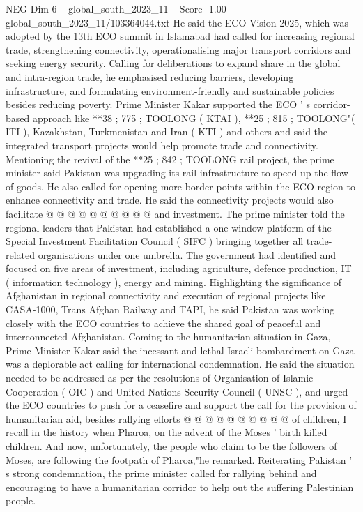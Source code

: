 \begin{textsample}{NEG Dim 6 – global\_south\_2023\_11 – Score -1.00 – global\_south\_2023\_11/103364044.txt}
He said the ECO Vision 2025, which was adopted by the 13th ECO summit in Islamabad had called for increasing regional trade, strengthening connectivity, operationalising major transport corridors and seeking energy security.
Calling for deliberations to expand share in the global and intra-region trade, he emphasised reducing barriers, developing infrastructure, and formulating environment-friendly and sustainable policies besides reducing poverty.
Prime Minister Kakar supported the ECO ' s corridor-based approach like **38 ; 775 ; TOOLONG ( KTAI ), **25 ; 815 ; TOOLONG"( ITI ), Kazakhstan, Turkmenistan and Iran ( KTI ) and others and said the integrated transport projects would help promote trade and connectivity.
Mentioning the revival of the **25 ; 842 ; TOOLONG rail project, the prime minister said Pakistan was upgrading its rail infrastructure to speed up the flow of goods.
He also called for opening more border points within the ECO region to enhance connectivity and trade.
He said the connectivity projects would also facilitate @ @ @ @ @ @ @ @ @ @ and investment.
The prime minister told the regional leaders that Pakistan had established a one-window platform of the Special Investment Facilitation Council ( SIFC ) bringing together all trade-related organisations under one umbrella.
The government had identified and focused on five areas of investment, including agriculture, defence production, IT ( information technology ), energy and mining.
Highlighting the significance of Afghanistan in regional connectivity and execution of regional projects like CASA-1000, Trans Afghan Railway and TAPI, he said Pakistan was working closely with the ECO countries to achieve the shared goal of peaceful and interconnected Afghanistan.
Coming to the humanitarian situation in Gaza, Prime Minister Kakar said the incessant and lethal Israeli bombardment on Gaza was a deplorable act calling for international condemnation.
He said the situation needed to be addressed as per the resolutions of Organisation of Islamic Cooperation ( OIC ) and United Nations Security Council ( UNSC ), and urged the ECO countries to push for a ceasefire and support the call for the provision of humanitarian aid, besides rallying efforts @ @ @ @ @ @ @ @ @ @ of children, I recall in the history when Pharoa, on the advent of the Moses ' birth killed children.
And now, unfortunately, the people who claim to be the followers of Moses, are following the footpath of Pharoa,"he remarked.
Reiterating Pakistan ' s strong condemnation, the prime minister called for rallying behind and encouraging to have a humanitarian corridor to help out the suffering Palestinian people.

\end{textsample}
